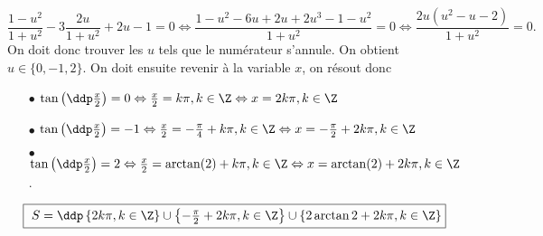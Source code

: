 \begin{correction}
\begin{enumerate}
$$\frac{1-u^2}{1+u^2} - 3 \frac{2u}{1+u^2} + 2u - 1 = 0 \Leftrightarrow \frac{1-u^2- 6u + 2u +2u^3-1-u^2}{1+u^2} = 0   \Leftrightarrow \frac{2u(u^2-u-2)}{1+u^2}  = 0.$$
On doit donc trouver les $u$ tels que le num\'erateur s'annule. On obtient $u \in \{0,-1, 2\}$. On doit ensuite revenir \`a la variable $x$, on r\'esout donc 
\begin{itemize}
\item[$\bullet$] $\tan\left( \ddp \frac{x}{2} \right) = 0 \Leftrightarrow \frac{x}{2} = k \pi, k \in \Z \Leftrightarrow  x = 2k\pi, k \in \Z$ 
\item[$\bullet$] $\tan\left( \ddp \frac{x}{2} \right) = -1\Leftrightarrow \frac{x}{2} = - \frac{\pi}{4} + k \pi, k \in \Z \Leftrightarrow  x = - \frac{\pi}{2} +2k\pi, k \in \Z$ 
\item[$\bullet$] $\tan\left( \ddp \frac{x}{2} \right) = 2 \Leftrightarrow \frac{x}{2} = \arctan(2) + k \pi, k \in \Z \Leftrightarrow  x = \arctan(2)  +2k\pi, k \in \Z$.
\end{itemize}
$$\fbox{ $ S = \ddp \left\{2 k \pi, k \in \Z \right\} \cup  \left\{-\frac{\pi}{2} + 2 k\pi, k \in \Z \right\} \cup \left\{2\arctan 2 + 2 k \pi, k \in \Z \right\} $}$$
\end{enumerate}
\end{correction}